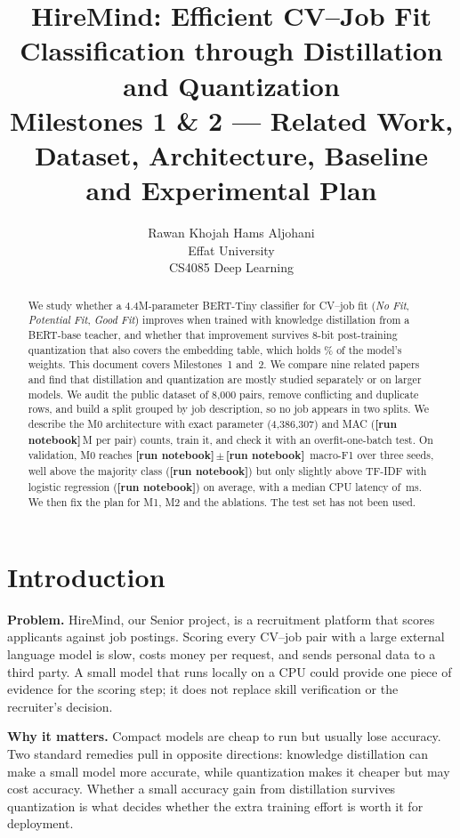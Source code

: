 \documentclass[11pt]{article}
\title{HireMind: Efficient CV--Job Fit Classification through Distillation and Quantization\\[4pt]
\large Milestones 1 \& 2 --- Related Work, Dataset, Architecture, Baseline and Experimental Plan}
\author{Rawan Khojah \quad Hams Aljohani\\Effat University\\CS4085 Deep Learning}
\newcommand{\RUN}{\textbf{[run notebook]}}
\newcommand{\MajFone}{\RUN}\newcommand{\MajAcc}{\RUN}\newcommand{\TfidfFone}{\RUN}\newcommand{\TfidfAcc}{\RUN}
\newcommand{\MzeroFoneMean}{\RUN}\newcommand{\MzeroFoneSD}{\RUN}\newcommand{\MzeroAccMean}{\RUN}\newcommand{\MzeroAccSD}{\RUN}
\newcommand{\MzeroParams}{4,386,307}\newcommand{\MzeroParamsM}{4.39}
\newcommand{\MzeroMACsM}{\RUN}\newcommand{\MzeroLayerMACsM}{\RUN}\newcommand{\MzeroMACsAnalyticM}{134.2}
\begin{document}
\maketitle

\begin{abstract}
We study whether a 4.4M-parameter BERT-Tiny classifier for CV--job fit (\emph{No Fit}, \emph{Potential Fit}, \emph{Good Fit}) improves when trained with knowledge distillation from a BERT-base teacher, and whether that improvement survives 8-bit post-training quantization that also covers the embedding table, which holds \MzeroEmbShare\% of the model's weights. This document covers Milestones~1 and~2. We compare nine related papers and find that distillation and quantization are mostly studied separately or on larger models. We audit the public dataset of 8,000 pairs, remove conflicting and duplicate rows, and build a split grouped by job description, so no job appears in two splits. We describe the M0 architecture with exact parameter (\MzeroParams) and MAC (\MzeroMACsM\,M per pair) counts, train it, and check it with an overfit-one-batch test. On validation, M0 reaches \MzeroFoneMean\,$\pm$\,\MzeroFoneSD\ macro-F1 over three seeds, well above the majority class (\MajFone) but only slightly above TF-IDF with logistic regression (\TfidfFone) on average, with a median CPU latency of \MzeroLatMed\,ms. We then fix the plan for M1, M2 and the ablations. The test set has not been used.
\end{abstract}

\section{Introduction}
\textbf{Problem.} HireMind, our Senior project, is a recruitment platform that scores applicants against job postings. Scoring every CV--job pair with a large external language model is slow, costs money per request, and sends personal data to a third party. A small model that runs locally on a CPU could provide one piece of evidence for the scoring step; it does not replace skill verification or the recruiter's decision.

\textbf{Why it matters.} Compact models are cheap to run but usually lose accuracy. Two standard remedies pull in opposite directions: knowledge distillation can make a small model more accurate, while quantization makes it cheaper but may cost accuracy. Whether a small accuracy gain from distillation survives quantization is what decides whether the extra training effort is worth it for deployment.
\end{document}
